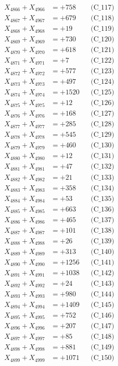 \documentclass[a4paper,10pt]{article}
\begin{document}
{\begin{align}
X_{4866} + X_{4966} &= +758 && \text{(C\_117)} \\
X_{4867} + X_{4967} &= +679 && \text{(C\_118)} \\
X_{4868} + X_{4968} &= +19 && \text{(C\_119)} \\
X_{4869} + X_{4969} &= +730 && \text{(C\_120)} \\
\allowbreak
X_{4870} + X_{4970} &= +618 && \text{(C\_121)} \\
X_{4871} + X_{4971} &= +7 && \text{(C\_122)} \\
X_{4872} + X_{4972} &= +577 && \text{(C\_123)} \\
X_{4873} + X_{4973} &= +497 && \text{(C\_124)} \\
X_{4874} + X_{4974} &= +1520 && \text{(C\_125)} \\
\allowbreak
X_{4875} + X_{4975} &= +12 && \text{(C\_126)} \\
X_{4876} + X_{4976} &= +168 && \text{(C\_127)} \\
X_{4877} + X_{4977} &= +285 && \text{(C\_128)} \\
X_{4878} + X_{4978} &= +545 && \text{(C\_129)} \\
X_{4879} + X_{4979} &= +460 && \text{(C\_130)} \\
\allowbreak
X_{4880} + X_{4980} &= +12 && \text{(C\_131)} \\
X_{4881} + X_{4981} &= +47 && \text{(C\_132)} \\
X_{4882} + X_{4982} &= +21 && \text{(C\_133)} \\
X_{4883} + X_{4983} &= +358 && \text{(C\_134)} \\
X_{4884} + X_{4984} &= +53 && \text{(C\_135)} \\
\allowbreak
X_{4885} + X_{4985} &= +663 && \text{(C\_136)} \\
X_{4886} + X_{4986} &= +465 && \text{(C\_137)} \\
X_{4887} + X_{4987} &= +101 && \text{(C\_138)} \\
X_{4888} + X_{4988} &= +26 && \text{(C\_139)} \\
X_{4889} + X_{4989} &= +313 && \text{(C\_140)} \\
\allowbreak
X_{4890} + X_{4990} &= +1256 && \text{(C\_141)} \\
X_{4891} + X_{4991} &= +1038 && \text{(C\_142)} \\
X_{4892} + X_{4992} &= +24 && \text{(C\_143)} \\
X_{4893} + X_{4993} &= +980 && \text{(C\_144)} \\
X_{4894} + X_{4994} &= +1409 && \text{(C\_145)} \\
\allowbreak
X_{4895} + X_{4995} &= +752 && \text{(C\_146)} \\
X_{4896} + X_{4996} &= +207 && \text{(C\_147)} \\
X_{4897} + X_{4997} &= +85 && \text{(C\_148)} \\
X_{4898} + X_{4998} &= +881 && \text{(C\_149)} \\
X_{4899} + X_{4999} &= +1071 && \text{(C\_150)} \\
\end{align}
}
\end{document}
